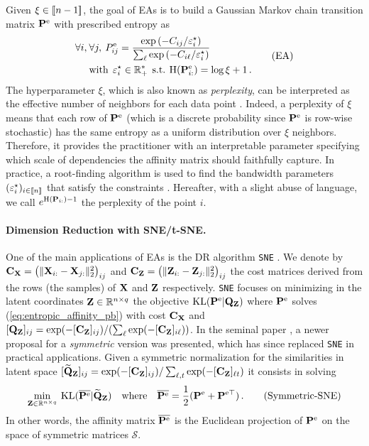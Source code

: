 Given $\xi \in {[\![n-1]\!]}$, the goal of EAs is to build a Gaussian Markov chain transition matrix $\mathbf{P}^{\mathrm{e}}$ with prescribed entropy as
\begin{equation}
\begin{split}
    \forall i, \: &\forall j, \: P^{\mathrm{e}}_{ij} = \frac{\exp{(-C_{ij}/\varepsilon^\star_i)}}{\sum_\ell \exp{(-C_{i\ell}/\varepsilon^\star_i)}} \\
    &\text{with} \:\: \varepsilon^\star_i \in \mathbb{R}^*_+ \:\: \text{s.t.} \: \operatorname{H}(\mathbf{P}^{\mathrm{e}}_{i:}) = \log{\xi} + 1\,. \label{eq:entropic_affinity_pb}
\end{split}\tag{EA}
\end{equation}
The hyperparameter $\xi$, which is also known as \emph{perplexity}, can be interpreted as the effective number of neighbors for each data point \cite{vladymyrov2013entropic}. Indeed, a perplexity of $\xi$ means that each row of $\mathbf{P}^{\mathrm{e}}$ (which is a discrete probability since $\mathbf{P}^{\mathrm{e}}$ is row-wise stochastic) has the same entropy as a uniform distribution over $\xi$ neighbors. Therefore, it provides the practitioner with an interpretable parameter specifying which scale of dependencies the affinity matrix should faithfully capture. In practice, a root-finding algorithm is used to find the bandwidth parameters $(\varepsilon_i^\star)_{i \in {[\![n]\!]}}$ that satisfy the constraints \cite{vladymyrov2013entropic}. Hereafter, with a slight abuse of language, we call $e^{\operatorname{H}(\mathbf{P}_{i:})-1}$ the perplexity of the point $i$.

\paragraph{Dimension Reduction with SNE/t-SNE.} One of the main applications of EAs
is the DR algorithm \texttt{SNE} \cite{hinton2002stochastic}. We
denote by $\mathbf{C}_{\mathbf{X}} = \left(\|\mathbf{X}_{i:}-\mathbf{X}_{j:}\|_2^2\right)_{ij}$ and $\mathbf{C}_{\mathbf{Z}} =
\left(\|\mathbf{Z}_{i:}-\mathbf{Z}_{j:}\|_2^2\right)_{ij}$ the cost matrices derived from the
rows (\ie the samples) of $\mathbf{X}$ and $\mathbf{Z}$ respectively. \texttt{SNE} focuses on
minimizing in the latent coordinates $\mathbf{Z} \in \mathbb{R}^{n \times q}$ the objective
$\operatorname{KL}(\mathbf{P}^\mathrm{e} | \mathbf{Q}_{\mathbf{Z}})$ where $\mathbf{P}^\mathrm{e}$ solves
(\ref{eq:entropic_affinity_pb}) with cost $\mathbf{C}_{\mathbf{X}}$ and $[\mathbf{Q}_{\mathbf{Z}}]_{ij} = \exp(-[\mathbf{C}_{\mathbf{Z}}]_{ij})/(\sum_{\ell}\exp(-[\mathbf{C}_{\mathbf{Z}}]_{i\ell}))$. In the seminal paper \citep{van2008visualizing}, a newer proposal for a \emph{symmetric} version was presented, which has since replaced \texttt{SNE} in practical applications. Given a symmetric
normalization for the similarities in latent space $[\widetilde{\mathbf{Q}}_{\mathbf{Z}}]_{ij} = \exp(-[\mathbf{C}_{\mathbf{Z}}]_{ij})/\sum_{\ell,t}\exp(-[\mathbf{C}_{\mathbf{Z}}]_{\ell t})$ it consists in solving 
\begin{align}\label{symmetrization_tsne}
    \min_{\mathbf{Z} \in \mathbb{R}^{n \times q}} \: \operatorname{KL}(\overline{\mathbf{P}^{\mathrm{e}}} | \widetilde{\mathbf{Q}}_{\mathbf{Z}}) \quad \text{where} \quad \overline{\mathbf{P}^{\mathrm{e}}} = \frac{1}{2}(\mathbf{P}^{\mathrm{e}} + \mathbf{P}^{\mathrm{e} \top}) \,.
\tag{Symmetric-SNE}
\end{align}
In other words, the affinity matrix $\overline{\mathbf{P}^{\mathrm{e}}}$ is the Euclidean projection of $\mathbf{P}^{\mathrm{e}}$ on the space of symmetric matrices $\mathcal{S}$.

